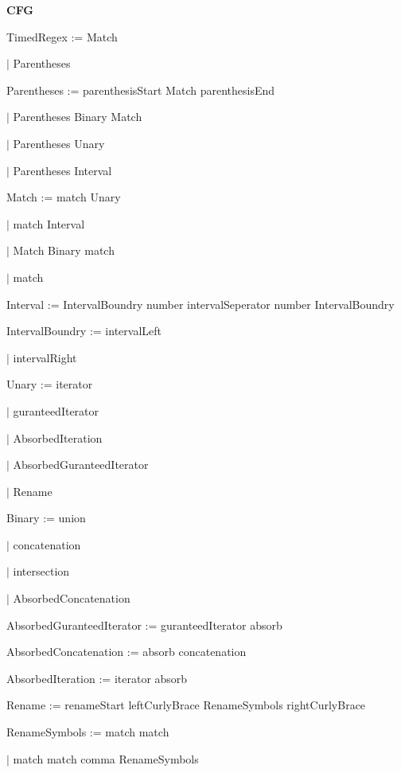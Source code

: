
\textbf{CFG}

TimedRegex := Match

\qquad	$\mid$ Parentheses

Parentheses := parenthesisStart Match parenthesisEnd

\qquad	$\mid$ Parentheses Binary Match

\qquad	$\mid$ Parentheses Unary

\qquad $\mid$ Parentheses Interval

Match := match Unary

\qquad	$\mid$ match Interval

\qquad    $\mid$ Match Binary match

\qquad	$\mid$ match

Interval := IntervalBoundry number intervalSeperator number IntervalBoundry

IntervalBoundry := intervalLeft

\qquad	$\mid$ intervalRight

Unary := iterator

\qquad	$\mid$ guranteedIterator

\qquad	$\mid$ AbsorbedIteration

\qquad	$\mid$ AbsorbedGuranteedIterator

\qquad	$\mid$ Rename

Binary := union

\qquad	$\mid$ concatenation

\qquad	$\mid$ intersection

\qquad	$\mid$ AbsorbedConcatenation

AbsorbedGuranteedIterator := guranteedIterator absorb 

AbsorbedConcatenation := absorb concatenation

AbsorbedIteration := iterator absorb 

Rename := renameStart leftCurlyBrace RenameSymbols rightCurlyBrace

RenameSymbols := match match

\qquad	$\mid$ match match comma RenameSymbols